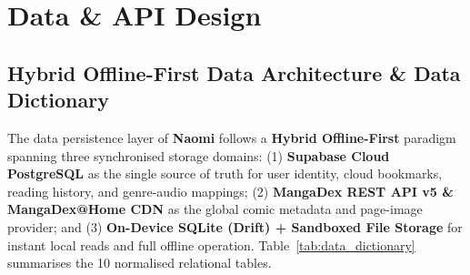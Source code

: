 \section{Data \& API Design}
\label{sec:data_api}

\subsection{Hybrid Offline-First Data Architecture \& Data Dictionary}
\label{subsec:data_dictionary}

The data persistence layer of \textbf{Naomi} follows a \textbf{Hybrid Offline-First} paradigm spanning three synchronised storage domains: (1) \textbf{Supabase Cloud PostgreSQL} as the single source of truth for user identity, cloud bookmarks, reading history, and genre-audio mappings; (2) \textbf{MangaDex REST API v5 \& MangaDex@Home CDN} as the global comic metadata and page-image provider; and (3) \textbf{On-Device SQLite (Drift) + Sandboxed File Storage} for instant local reads and full offline operation. Table~\ref{tab:data_dictionary} summarises the 10 normalised relational tables.

